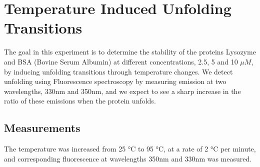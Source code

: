 \documentclass[a4paper,11pt]{article}
\begin{document}
    \section{Temperature Induced Unfolding Transitions}
        The goal in this experiment is to determine the stability of the proteins Lysozyme and BSA 
        (Bovine Serum Albumin) at different concentrations, 2.5, 5 and 10 $\mu M$, by inducing unfolding 
        transitions through temperature changes.
        We detect unfolding using Fluorescence spectroscopy by measuring emission at 
        two wavelengths, 330nm and 350nm, and we expect to see a sharp increase in the ratio
        of these emissions when the protein unfolds.

        \subsection*{Measurements}
            The temperature was increased from 25 °C to 95 °C, at a rate of 2 °C per minute,
            and corresponding fluorescence at wavelengths 350nm and 330nm was measured.
\end{document}
